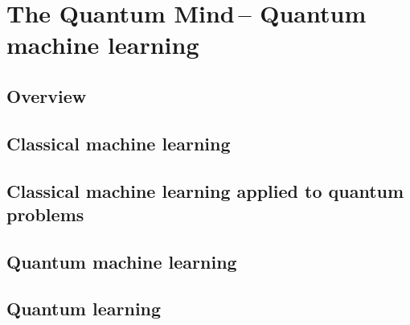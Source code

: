 %
%

\section{The Quantum Mind\texttrademark\,-- Quantum machine learning}\label{sec:quantum_mind}


\cite{bib:lloyd2013quantum}


\subsection{Overview}

\subsection{Classical machine learning}

\subsection{Classical machine learning applied to quantum problems}

\subsection{Quantum machine learning}

\subsection{Quantum learning}
